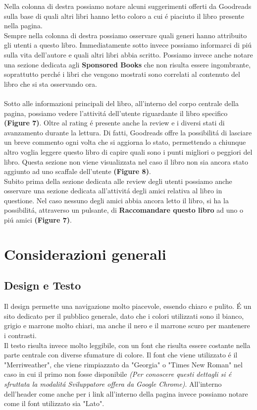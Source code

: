 \documentclass[12pt]{article}
\begin{document}
Nella colonna di destra possiamo notare alcuni suggerimenti offerti da Goodreads sulla base di quali altri libri hanno letto coloro a cui \'e piaciuto il libro presente nella pagina.\\ 
Sempre nella colonna di destra possiamo osservare quali generi hanno attribuito gli utenti a questo libro. Immediatamente sotto invece possiamo informarci di pi\'u sulla vita dell'autore e quali altri libri abbia scritto. Possiamo invece anche notare una sezione dedicata agli \textbf{Sponsored Books} che non risulta essere ingombrante, soprattutto perch\'e i libri che vengono mostrati sono correlati al contenuto del libro che si sta osservando ora.\\\\
Sotto alle informazioni principali del libro, all'interno del corpo centrale della pagina, possiamo vedere l'attivit\'a dell'utente riguardante il libro specifico \textbf{(Figure 7)}. Oltre al rating \'e presente anche la review e i diversi stati di avanzamento durante la lettura. Di fatti, Goodreads offre la possibilit\'a di lasciare un breve commento ogni volta che si aggiorna lo stato, permettendo a chiunque altro voglia leggere questo libro di capire quali sono i punti migliori o peggiori del libro. Questa sezione non viene visualizzata nel caso il libro non sia ancora stato aggiunto ad uno scaffale dell'utente \textbf{(Figure 8)}.\\
Subito prima della sezione dedicata alle review degli utenti possiamo anche osservare una sezione dedicata all'attivit\'a degli amici relativa al libro in questione. Nel caso nessuno degli amici abbia ancora letto il libro, si ha la possibilit\'a, attraverso un pulsante, di \textbf{Raccomandare questo libro} ad uno o pi\'u amici \textbf{(Figure 7)}.


\section{Considerazioni generali}

\subsection{Design e Testo}
Il design permette una navigazione molto piacevole, essendo chiaro e pulito. \'E un sito dedicato per il pubblico generale, dato che i colori utilizzati sono il bianco, grigio e marrone molto chiari, ma anche il nero e il marrone scuro per mantenere i contrasti.\\
Il testo risulta invece molto leggibile, con un font che risulta essere costante nella parte centrale con diverse sfumature di colore. Il font che viene utilizzato \'e il "Merriweather", che viene rimpiazzato da "Georgia" o "Times New Roman" nel caso in cui il primo non fosse disponibile \textit{(Per conoscere questi dettagli si \'e sfruttata la modalit\'a Sviluppatore offera da Google Chrome)}. All'interno dell'header  come anche per i link all'interno della pagina invece possiamo notare come il font utilizzato sia "Lato".
\end{document}
